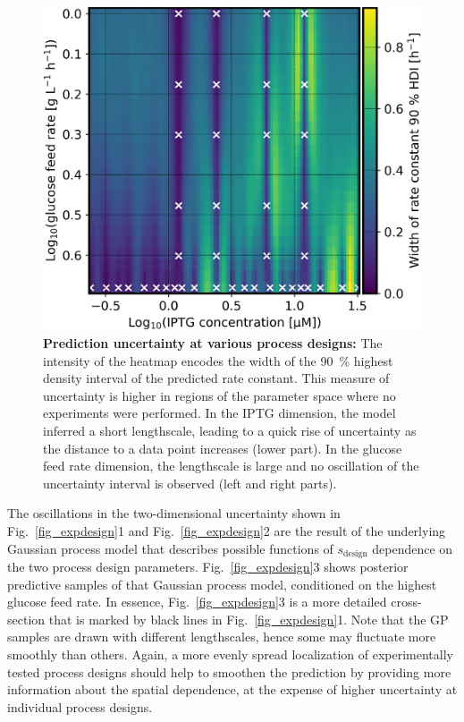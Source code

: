\documentclass[sn-standardnature]{sn-jnl}%
\theoremstyle{thmstyleone}%
\theoremstyle{thmstyletwo}%
\theoremstyle{thmstylethree}%
\begin{document}
\begin{figure}[h]
    \centering
    \includegraphics[width=1.0\textwidth]{figures/plot_pp_dense_dense_k_design_interval.png}
    \caption{
        \textbf{Prediction uncertainty at various process designs:}
        The intensity of the heatmap encodes the width of the 90~\% highest density interval of the predicted rate constant.
        This measure of uncertainty is higher in regions of the parameter space where no experiments were performed.
        In the IPTG dimension, the model inferred a short lengthscale, leading to a quick rise of uncertainty as the distance to a data point increases (lower part).
        In the glucose feed rate dimension, the lengthscale is large and no oscillation of the uncertainty interval is observed (left and right parts).
    }
    \label{fig_sdesign_interval}
\end{figure}

The oscillations in the two-dimensional uncertainty shown in Fig.~\ref{fig_expdesign}1 and Fig.~\ref{fig_expdesign}2 are the result of the underlying Gaussian process model that describes possible functions of $s_\text{design}$ dependence on the two process design parameters.
Fig.~\ref{fig_expdesign}3 shows posterior predictive samples of that Gaussian process model, conditioned on the highest glucose feed rate.
In essence, Fig.~\ref{fig_expdesign}3 is a more detailed cross-section that is marked by black lines in Fig.~\ref{fig_expdesign}1.
Note that the GP samples are drawn with different lengthscales, hence some may fluctuate more smoothly than others.
Again, a more evenly spread localization of experimentally tested process designs should help to smoothen the prediction by providing more information about the spatial dependence, at the expense of higher uncertainty at individual process designs.
\end{document}
